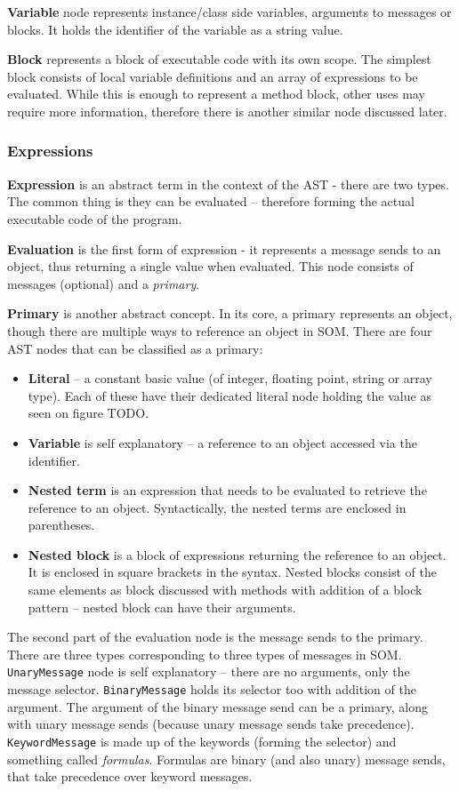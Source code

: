 \documentclass[thesis=M,english]{FITthesis}[2019/12/23]
\begin{document}
\textbf{Variable} node represents instance/class side variables, arguments to messages or blocks. It holds the identifier of the variable as a string value.

\textbf{Block} represents a block of executable code with its own scope. The simplest block consists of local variable definitions and an array of
expressions to be evaluated. While this is enough to represent a method block, other uses may require more information, therefore there is another
similar node discussed later.

\subsubsection{Expressions}
\textbf{Expression} is an abstract term in the context of the AST - there are two types. The common thing is they can be evaluated -- therefore forming
the actual executable code of the program. 

\textbf{Evaluation} is the first form of expression - it represents a message sends to an object, thus returning a single value when evaluated. This node
consists of messages (optional) and a \textit{primary}.

\textbf{Primary} is another abstract concept. In its core, a primary represents an object, though there are multiple ways to reference an object in SOM.
There are four AST nodes that can be classified as a primary:
\begin{itemize}
	\item \textbf{Literal} -- a constant basic value (of integer, floating point, string or array type). Each of these have their dedicated literal node
		holding the value as seen on figure TODO.
	\item \textbf{Variable} is self explanatory -- a reference to an object accessed via the identifier.
	\item \textbf{Nested term} is an expression that needs to be evaluated to retrieve the reference to an object. Syntactically, the nested terms
		are enclosed in parentheses.
	\item \textbf{Nested block} is a block of expressions returning the reference to an object. It is enclosed in square brackets in the syntax.
		Nested blocks consist of the same elements as block discussed with methods with addition of a block pattern -- nested block can have their arguments. %
\end{itemize}

The second part of the evaluation node is the message sends to the primary. There are three types corresponding to three types of messages in SOM.
\texttt{UnaryMessage} node is self explanatory -- there are no arguments, only the message selector. \texttt{BinaryMessage} holds its selector too
with addition of the argument. The argument of the binary message send can be a primary, along with unary message sends (because unary message sends take
precedence). \texttt{KeywordMessage} is made up of the keywords (forming the selector) and something called \textit{formulas}. Formulas are binary (and also unary) message
sends, that take precedence over keyword messages.
\end{document}
